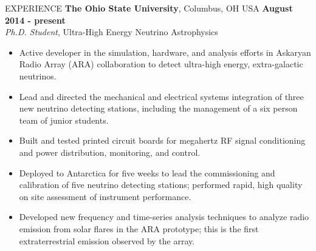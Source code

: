 \documentclass{resume} %
\begin{document}
\begin{rSection}{EXPERIENCE}
{\bf The Ohio State University}, Columbus, OH USA \hfill {\bf August 2014 - present} \\
 {\em Ph.D. Student}, Ultra-High Energy Neutrino Astrophysics
\begin{itemize}
\vspace*{.05in}
\item Active developer in the simulation, hardware, and analysis efforts in Askaryan Radio Array (ARA) collaboration to detect ultra-high energy, extra-galactic neutrinos.
\item Lead and directed the mechanical and electrical systems integration of three new neutrino detecting stations, including the management of a six person team of junior students.
\item Built and tested printed circuit boards for megahertz RF signal conditioning and power distribution, monitoring, and control.
\item Deployed to Antarctica for five weeks to lead the commissioning and calibration of five neutrino detecting stations; performed rapid, high quality on site assessment of instrument performance.
\item Developed new frequency and time-series analysis techniques to analyze radio emission from solar flares in the ARA prototype; this is the first extraterrestrial emission observed by the array.
\end{itemize}



\end{rSection}
\end{document}
